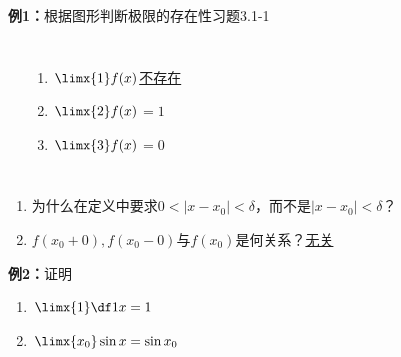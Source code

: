 \begin{frame}
	\linespread{1.2}
	\begin{exampleblock}{{\bf 例1：}根据图形判断极限的存在性\hfill 习题3.1-1}\pause 
		\begin{columns}
				\begin{center}
				\end{center}
				\begin{enumerate}\pause 
				  \item $\limx{1}f(x)$\pause \underline{\alert{不存在}}\pause 
				  \item $\limx{2}f(x)$\pause \underline{\alert{\;\;$=1$\;\;\;}}\pause 
				  \item $\limx{3}f(x)$\pause \underline{\alert{\;\;$=0$\;\;\;}}\pause 
				\end{enumerate}
		\end{columns}
	\end{exampleblock}
	\begin{enumerate}
		\item {为什么在定义中要求$0<|x-x_0|<\delta$，而不是$|x-x_0|<\delta$？}\pause 
		\item {$f(x_0+0),f(x_0-0)$与$f(x_0)$是何关系？}\pause \underline{\alert{\;无关\;}}
	\end{enumerate}
\end{frame}

\begin{frame}
	\linespread{2}
	\begin{exampleblock}{{\bf 例2：}证明\hfill}
		\begin{enumerate}
		  \item $\limx{1}\df 1x=1$\pause 
		  \item $\limx{x_0}\sin x=\sin x_0$
		\end{enumerate}
	\end{exampleblock}
\end{frame}

